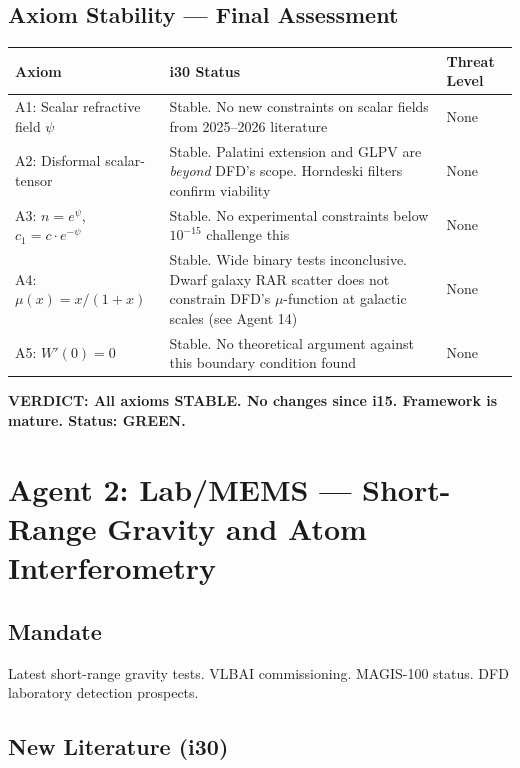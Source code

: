 \documentclass[11pt,a4paper]{article}
\newcommand{\GREEN}{\textcolor{dfdgreen}{\textbf{GREEN}}}
\begin{document}
\subsection{Axiom Stability --- Final Assessment}

\begin{center}
\begin{tabular}{lp{8cm}l}
\toprule
\textbf{Axiom} & \textbf{i30 Status} & \textbf{Threat Level} \\
\midrule
A1: Scalar refractive field $\psi$ & Stable. No new constraints on scalar fields from 2025--2026 literature & None \\
A2: Disformal scalar-tensor & Stable. Palatini extension and GLPV are \emph{beyond} DFD's scope. Horndeski filters confirm viability & None \\
A3: $n = e^\psi$, $c_1 = c \cdot e^{-\psi}$ & Stable. No experimental constraints below $10^{-15}$ challenge this & None \\
A4: $\mu(x) = x/(1+x)$ & Stable. Wide binary tests inconclusive. Dwarf galaxy RAR scatter does not constrain DFD's $\mu$-function at galactic scales (see Agent 14) & None \\
A5: $W'(0) = 0$ & Stable. No theoretical argument against this boundary condition found & None \\
\bottomrule
\end{tabular}
\end{center}

\textbf{VERDICT: All axioms STABLE. No changes since i15. Framework is mature. Status: \GREEN.}

\section{Agent 2: Lab/MEMS --- Short-Range Gravity and Atom Interferometry}

\subsection{Mandate}
Latest short-range gravity tests. VLBAI commissioning. MAGIS-100 status. DFD laboratory detection prospects.

\subsection{New Literature (i30)}
\end{document}

